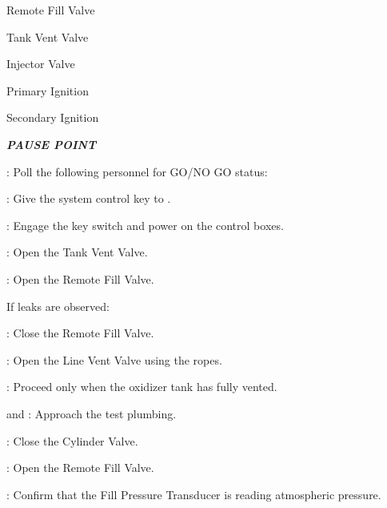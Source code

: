\begin{checklist}
    \begin{checklist}
        \item Remote Fill Valve
        \item Tank Vent Valve
        \item Injector Valve
        \item Primary Ignition
        \item Secondary Ignition
    \end{checklist}
    \item \textbf{\textit{PAUSE POINT}}
    \item \ops{}: Poll the following personnel for GO/NO GO status:
    \begin{checklist}
        \item \peri{}
        \item \perii{}
        \item \periii{}
        \item \heat{}
        \item \daq{}
        \item \control{}
        \item \primary{}
        \item \secondary{}
    \end{checklist}
    \item \ops{}: Give the system control key to \control{}.
    \item \control{}: Engage the key switch and power on the control boxes.
    \item \control{}: Open the Tank Vent Valve.
    \item \control{}: Open the Remote Fill Valve.
    \begin{checklist}[label=$\bullet$]
        \item If leaks are observed:
        \begin{checklist}
            \item \control{}: Close the Remote Fill Valve.
            \item \primary{}: Open the Line Vent Valve using the ropes.
            \item \ops{}: Proceed only when the oxidizer tank has fully vented.
            \item \primary{} and \secondary{}: Approach the test plumbing.
            \item \primary{}: Close the Cylinder Valve.
            \item \control{}: Open the Remote Fill Valve.
            \item \daq{}: Confirm that the Fill Pressure Transducer is reading atmospheric pressure.

\end{checklist}
\end{checklist}
\end{checklist}
